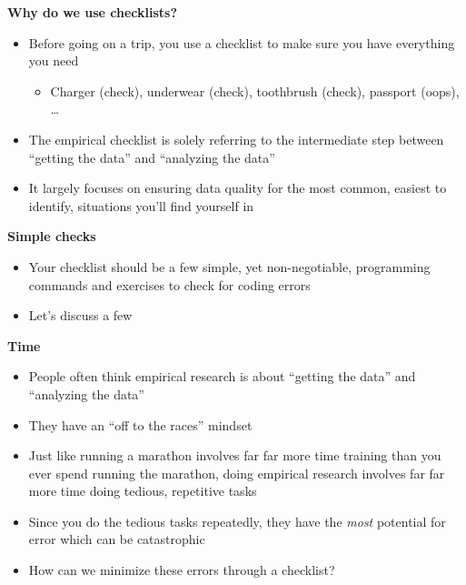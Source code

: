 \documentclass[notes=show]{beamer}
\begin{document}
\begin{frame}[plain]
\begin{center}
\textbf{Why do we use checklists?}
\end{center}

\begin{itemize}
\item Before going on a trip, you use a checklist to make sure you have everything you need
	\begin{itemize}
	\item Charger (check), underwear (check), toothbrush (check), passport (oops), \dots
	\end{itemize}
\item The empirical checklist is solely referring to the intermediate step between ``getting the data'' and ``analyzing the data''
\item It largely focuses on ensuring data quality for the most common, easiest to identify, situations you'll find yourself in
\end{itemize}

\end{frame}


\begin{frame}[plain]
\begin{center}
\textbf{Simple checks}
\end{center}

\begin{itemize}
\item Your checklist should be a few simple, yet non-negotiable, programming commands and exercises to check for coding errors
\item Let's discuss a few
\end{itemize}

\end{frame}


\begin{frame}[plain]
\begin{center}
\textbf{Time}
\end{center}

\begin{itemize}
\item People often think empirical research is about ``getting the data'' and ``analyzing the data''
\item They have an ``off to the races'' mindset
\item Just like running a marathon involves far far more time training than you ever spend running the marathon, doing empirical research involves far far more time doing tedious, repetitive tasks
\item Since you do the tedious tasks repeatedly, they have the \emph{most} potential for error which can be catastrophic
\item How can we minimize these errors through a checklist?
\end{itemize}

\end{frame}
\end{document}
